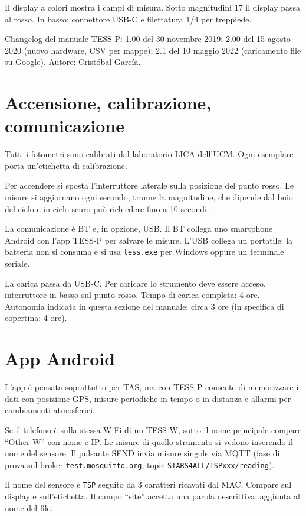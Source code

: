 \documentclass[11pt,a4paper]{report}
\begin{document}
Il display a colori mostra i campi di misura. Sotto magnitudini 17 il display passa al rosso. In basso: connettore USB-C e filettatura 1/4 per treppiede.

Changelog del manuale TESS-P: 1.00 del 30 novembre 2019; 2.00 del 15 agosto 2020 (nuovo hardware, CSV per mappe); 2.1 del 10 maggio 2022 (caricamento file su Google). Autore: Cristóbal García.

\section{Accensione, calibrazione, comunicazione}

Tutti i fotometri sono calibrati dal laboratorio LICA dell'UCM. Ogni esemplare porta un'etichetta di calibrazione.

Per accendere si sposta l'interruttore laterale sulla posizione del punto rosso. Le misure si aggiornano ogni secondo, tranne la magnitudine, che dipende dal buio del cielo e in cielo scuro può richiedere fino a 10 secondi.

La comunicazione è BT e, in opzione, USB. Il BT collega uno smartphone Android con l'app TESS-P per salvare le misure. L'USB collega un portatile: la batteria non si consuma e si usa \texttt{tess.exe} per Windows oppure un terminale seriale.

La carica passa da USB-C. Per caricare lo strumento deve essere acceso, interruttore in basso sul punto rosso. Tempo di carica completa: 4 ore. Autonomia indicata in questa sezione del manuale: circa 3 ore (in specifica di copertina: 4 ore).

\section{App Android}

L'app è pensata soprattutto per TAS, ma con TESS-P consente di memorizzare i dati con posizione GPS, misure periodiche in tempo o in distanza e allarmi per cambiamenti atmosferici.

Se il telefono è sulla stessa WiFi di un TESS-W, sotto il nome principale compare ``Other W'' con nome e IP. Le misure di quello strumento si vedono inserendo il nome del sensore. Il pulsante SEND invia misure singole via MQTT (fase di prova sul broker \texttt{test.mosquitto.org}, topic \texttt{STARS4ALL/TSPxxx/reading}).

Il nome del sensore è \texttt{TSP} seguito da 3 caratteri ricavati dal MAC. Compare sul display e sull'etichetta. Il campo ``site'' accetta una parola descrittiva, aggiunta al nome del file.
\end{document}
